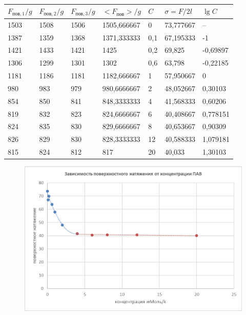 \documentclass[a4paper,12pt]{article} %
\begin{document}
\begin{table}[h!]
\centering
\caption{}
\label{my-label}
\begin{tabular}{|l|l|l|l|l|l|l|}
\hline
$F_{\text{пов},1}/g$ & $F_{\text{пов},2}/g$ & $F_{\text{пов},3}/g$ & $<F_{\text{пов}}>/g$          & $C$   & $\sigma=F/2l$ & $\lg C$      \\
\hline
1503      & 1508      & 1506      & 1505,666667 & 0   & 73,777667  & --       \\
\hline
1387      & 1359      & 1368      & 1371,333333 & 0,1 & 67,195333  & -1       \\
\hline
1421      & 1433      & 1421      & 1425        & 0,2 & 69,825     & -0,69897 \\
\hline
1306      & 1299      & 1301      & 1302        & 0,6 & 63,798     & -0,22185 \\
\hline
1181      & 1186      & 1181      & 1182,666667 & 1   & 57,950667  & 0        \\
\hline
980       & 983       & 979       & 980,6666667 & 2   & 48,052667  & 0,30103  \\
\hline
854       & 850       & 841       & 848,3333333 & 4   & 41,568333  & 0,60206  \\
\hline
819       & 832       & 823       & 824,6666667 & 6   & 40,408667  & 0,778151 \\
\hline
824       & 835       & 830       & 829,6666667 & 8   & 40,653667  & 0,90309  \\
\hline
826       & 829       & 830       & 828,3333333 & 12  & 40,588333  & 1,079181 \\
\hline
815       & 824       & 812       & 817         & 20  & 40,033     & 1,30103  \\
\hline
\end{tabular}
\end{table}

\begin{figure}[h]
\includegraphics[width=1\textwidth]{image003.png}
\caption{}
\end{figure}
\end{document}
